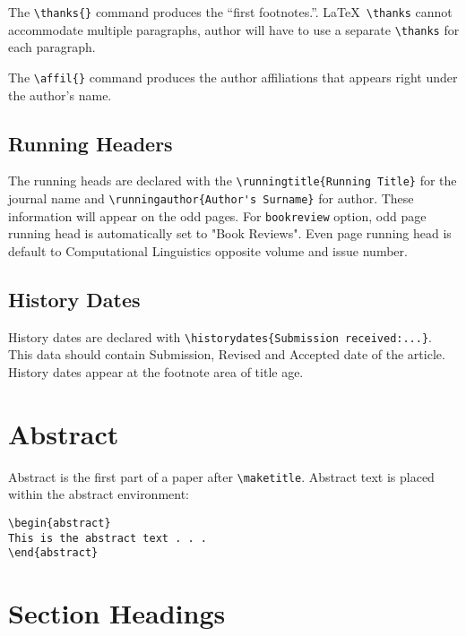 \documentclass{clv3}
\begin{document}
The \verb|\thanks{}| command produces the ``first footnotes.''. \LaTeX\ \verb|\thanks|
cannot accommodate multiple paragraphs, author will have to use a separate \verb|\thanks|
for each paragraph.

The \verb|\affil{}| command produces the author affiliations that appears right under
the author's name.

\subsection{Running Headers}
The running heads are declared with the \verb|\runningtitle{Running Title}| for the
journal name and \verb|\runningauthor{Author's Surname}| for author. These information
will appear on the odd pages. For {\tt bookreview} option, odd page running head is
automatically set to "Book Reviews". Even page running head is default to Computational
Linguistics opposite volume and issue number.

\subsection{History Dates}

History dates are declared with \verb|\historydates{Submission received:...}|. This data
should contain Submission, Revised and Accepted date of the article. History dates appear
at the footnote area of title age.


\section{Abstract}

Abstract is the first part of a paper after \verb|\maketitle|. Abstract text is
placed within the abstract environment:

\begin{verbatim}
\begin{abstract}
This is the abstract text . . .
\end{abstract}
\end{verbatim}

\section{Section Headings}
\end{document}
